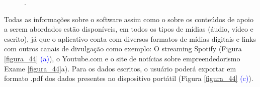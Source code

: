 \begin{figure}[H]
.
\label{figura_42}
\end{figure}
 


Todas as informações sobre o software assim como o sobre os conteúdos de apoio a serem abordados estão disponíveis, em todos os tipos de mídias (áudio, vídeo e escrito), já que o aplicativo conta com diversos formatos de mídias digitais e links com outros canais de divulgação como exemplo: O streaming Spotify (Figura \ref{figura_44} \textcolor{blue}{(a)}), o Youtube.com e o site de notícias sobre empreendedorismo Exame \ref{figura_44}a).  Para os dados escritos, o usuário poderá exportar em formato .pdf dos dados presentes no dispositivo portátil (Figura \ref{figura_44} \textcolor{blue}{(c)}).

